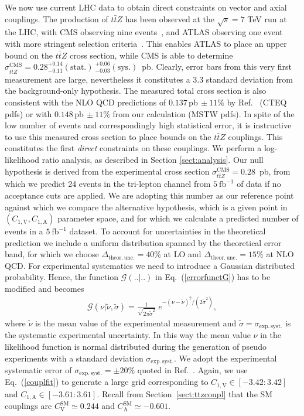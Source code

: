 \documentclass{JHEP3}
\newcommand{\mrm}{\mathrm}
\def\ttbZ{t\bar{t}Z}
\def\invfb {\mathrm{fb}^{-1}}
\def\ConeA{C_{1,\mathrm{A}}}
\def\ConeV{C_{1,\mathrm{V}}}
\def\ConeVSM{C_\mathrm{V}^{\mrm{SM}}}
\def\ConeASM{C_\mathrm{A}^{\mrm{SM}}}
\newcommand{\be}{\begin{eqnarray}}
\newcommand{\ee}{\end{eqnarray}}
\begin{document}
We now use current LHC data to obtain direct constraints on vector and axial couplings. The production of $\ttbZ$ has been observed at the $\sqrt{s}=7$ TeV run at the LHC, 
with CMS observing nine events~\cite{Chatrchyan:2013qca}, and ATLAS observing one event with more stringent selection criteria~\cite{ATLAS-CONF-2012-126}. 
This enables ATLAS to place an upper bound on the $\ttbZ$ cross section, 
while CMS is able to determine $\sigma_{\ttbZ}^{\mathrm{CMS}} = 0.28^{+0.14}_{-0.11}\mathrm{(stat.)}~^{+0.06}_{-0.03}\mathrm{(sys.)}$~pb. 
Clearly, error bars from this very first measurement are large, nevertheless it constitutes a 3.3 standard deviation from the background-only hypothesis.
The measured total cross section is also consistent with the NLO QCD predictions of $0.137\,$pb$\,\pm 11\%$ by Ref.~\cite{Garzelli:2011is} (CTEQ pdfs) 
or with $0.148\,$pb$\,\pm 11\%$ from our calculation (MSTW pdfs). 
In spite of the low number of events and correspondingly high statistical error, it is instructive to use this measured cross section to place bounds on the $\ttbZ$ couplings. 
This constitutes the first {\it direct} constraints on these couplings.
We perform a log-likelihood ratio analysis, as described in Section \ref{sect:analysis}. 
Our null hypothesis is derived from the experimental cross section $\sigma_{\ttbZ}^{\mathrm{CMS}}=0.28$~pb, from which we predict 24 events in the tri-lepton channel 
from $5~\invfb$ of data if no acceptance cuts are applied. 
We are adopting this number as our reference point against which we compare the alternative hypothesis, 
which is a given point in $(\ConeV,\ConeA)$ parameter space, and for which we calculate a predicted number of events in a $5~\invfb$ dataset.
To account for uncertainties in the theoretical prediction we include a uniform distribution spanned by the theoretical error band, 
for which we choose $\Delta_\mathrm{theor.\,unc.} = 40\%$ at LO and $\Delta_\mathrm{theor.\,unc.} = 15\%$ at NLO QCD.
For experimental systematics we need to introduce a Gaussian distributed probability. 
Hence, the function $\mathcal{G}(..|..)$ in Eq.~(\ref{errorfunctG}) has to be modified and becomes
\be
  \label{Gaussuncert}
  \mathcal{G} \left( \nu | \tilde{\nu},\tilde{\sigma} \right) = \frac{1}{\sqrt{2\pi\tilde{\sigma}^2}} \; e^{-(\nu-\tilde{\nu})^2 / (2\tilde{\sigma}^2)}, 
\ee
where $\tilde{\nu}$ is the mean value of the experimental measurement and $\tilde{\sigma}=\sigma_\mathrm{exp.\,syst.}$ is the systematic experimental uncertainty. 
In this way the mean value $\nu$ in the likelihood function is normal distributed during the generation of pseudo experiments with 
a standard deviation  $\sigma_\mathrm{exp.\,syst.}$. 
We adopt the experimental systematic error of $\sigma_\mathrm{exp.\,syst.}=\pm 20\%$ quoted in Ref.~\cite{Chatrchyan:2013qca}. 
Again, we use Eq.~(\ref{couplfit}) to generate a large grid corresponding to $\ConeV \in [-3.42:3.42]$ and $\ConeA \in [-3.61:3.61]$. 
Recall from Section~\ref{sect:ttzcoupl} that the SM couplings are $\ConeVSM \simeq 0.244$ and $\ConeASM \simeq -0.601$.
%
\end{document}
